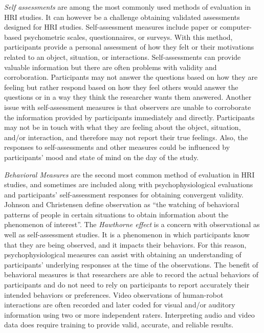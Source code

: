 \emph{Self assessments} are among the most commonly used methods of evaluation in HRI studies. It can however be a challenge obtaining validated assessments designed for HRI studies. Self-assessment measures include paper or computer-based psychometric scales, questionnaires, or surveys. With this method, participants provide a personal assessment of how they felt or their motivations related to an object, situation, or interactions. Self-assessments can provide valuable information but there are often problems with validity and corroboration. Participants may not answer the questions based on how they are feeling but rather respond based on how they feel others would answer the questions or in a way they think the researcher wants them answered. Another issue with self-assessment measures is that observers are unable to corroborate the information provided by participants immediately and directly. Participants may not be in touch with what they are feeling about the object, situation, and/or interaction, and therefore may not report their true feelings. Also, the responses to self-assessments and other measures could be influenced by participants’ mood and state of mind on the day of the study. 

\emph{Behavioral Measures} are the second most common method of evaluation in HRI studies, and sometimes are included along with psychophysiological evaluations and participants’ self-assessment responses for obtaining convergent validity. Johnson and Christensen define observation as “the watching of behavioral patterns of people in certain situations to obtain information about the phenomenon of interest”. The \emph{Hawthorne effect} is a concern with observational as well as self-assessment studies. It is a phenomenon in which participants know that they are being observed, and it impacts their behaviors. For this reason, psychophysiological measures can assist with obtaining an understanding of participants’ underlying responses at the time of the observations. The benefit of behavioral measures is that researchers are able to record the actual behaviors of participants and do not need to rely on participants to report accurately their intended behaviors or preferences. Video observations of human-robot interactions are often recorded and later coded for visual and/or auditory information using two or more independent raters. Interpreting audio and video data does require training to provide valid, accurate, and reliable results.

